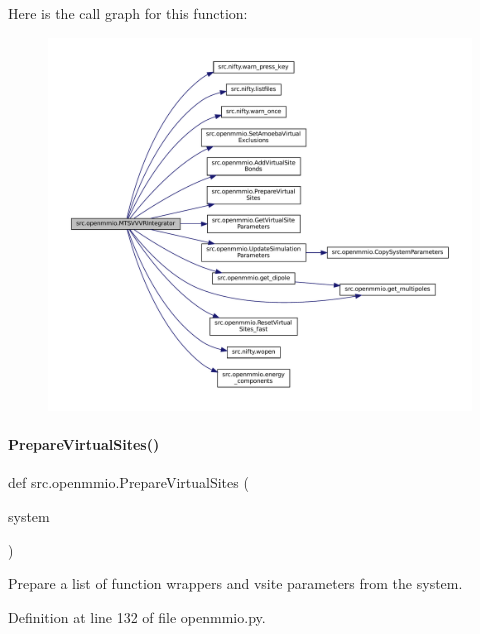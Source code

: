 Here is the call graph for this function\+:
\nopagebreak
\begin{figure}[H]
\begin{center}
\leavevmode
\includegraphics[width=350pt]{namespacesrc_1_1openmmio_aa8e806e2d494fc1c36153e8523ba99ff_cgraph}
\end{center}
\end{figure}
\mbox{\label{namespacesrc_1_1openmmio_a14cbde182c75ab72b116ec6eb9bd92f2}} 
\paragraph{\texorpdfstring{Prepare\+Virtual\+Sites()}{PrepareVirtualSites()}}
{\footnotesize\ttfamily def src.\+openmmio.\+Prepare\+Virtual\+Sites (\begin{DoxyParamCaption}\item[{}]{system }\end{DoxyParamCaption})}



Prepare a list of function wrappers and vsite parameters from the system. 



Definition at line 132 of file openmmio.\+py.

\mbox{\label{namespacesrc_1_1openmmio_ac0f168dd1caad3c5fe49e598758095c1}} 
